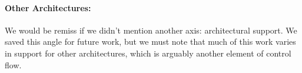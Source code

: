 


\paragraph{Other Architectures:} We would be remiss if we didn't mention another axis: architectural support. 
%
We saved this angle for future work, but we must note that much of this work varies in support for other architectures, which is arguably another element of control flow.




